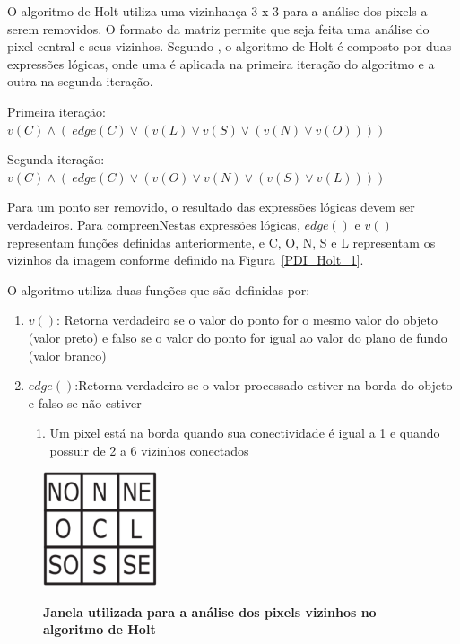 \documentclass[12pt,oneside,a4paper,english,french,spanish,brazil,]{abntex2}
\begin{document}
O algoritmo de Holt \cite{holt:1987} utiliza uma vizinhança 3 x 3 para a análise dos pixels a serem removidos. O formato da matriz permite que seja feita uma análise do pixel central e seus vizinhos. Segundo \citet{guilherme:2007}, o algoritmo de Holt é composto por duas expressões lógicas, onde uma é aplicada na primeira iteração do algoritmo e a outra na segunda iteração.

Primeira iteração: 
\(v(C) \wedge (~ edge(C) \vee (v(L) \vee v(S) \vee (v(N) \vee v(O))))\)

Segunda iteração:
\(v(C) \wedge (~ edge(C) \vee (v(O) \vee v(N) \vee (v(S) \vee v(L))))\)

Para um ponto ser removido, o resultado das expressões lógicas devem ser verdadeiros. Para compreenNestas expressões lógicas, \(edge()\) e \(v()\) representam funções definidas anteriormente, e C, O, N, S e L representam os vizinhos da imagem conforme definido na Figura~\ref{PDI_Holt_1}.

O algoritmo utiliza duas funções que são definidas por:
\begin{enumerate}
\item \(v()\): Retorna verdadeiro se o valor do ponto for o mesmo valor do objeto (valor preto) e falso se o valor do ponto for igual ao valor do plano de fundo (valor branco)
\item \(edge()\):Retorna verdadeiro se o valor processado estiver na borda do objeto e falso se não estiver
\begin{enumerate}[label*=\roman*.]
    \item Um pixel está na borda quando sua conectividade é igual a 1 e quando possuir de 2 a 6 vizinhos conectados
  \end{enumerate}
\end{enumerate}

\begin{figure}[ht]
\centering
\caption{\textbf{Janela utilizada para a análise dos pixels vizinhos no algoritmo de Holt}}
\includegraphics[width=0.3\textwidth]{imagens/PDI_Holt_1.PNG}
\label{fig:PDI_Holt_1}
\end{figure}
\end{document}
